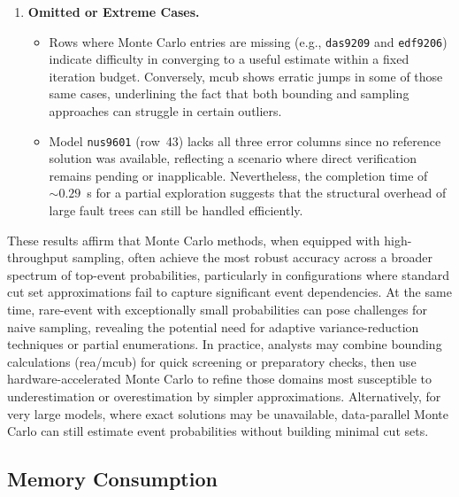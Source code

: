 \begin{enumerate}
    \item \textbf{Omitted or Extreme Cases.}
    \begin{itemize}
        \item Rows where Monte Carlo entries are missing (e.g., \texttt{das9209} and \texttt{edf9206}) indicate difficulty in converging to a useful estimate within a fixed iteration budget. Conversely, \acrshort{mcub} shows erratic jumps in some of those same cases, underlining the fact that both bounding and sampling approaches can struggle in certain outliers.
        \item Model \texttt{nus9601} (row~43) lacks all three error columns since no reference solution was available, reflecting a scenario where direct verification remains pending or inapplicable. Nevertheless, the completion time of \(\sim 0.29\)~s for a partial exploration suggests that the structural overhead of large fault trees can still be handled efficiently.
    \end{itemize}
\end{enumerate}

These results affirm that Monte Carlo methods, when equipped with high-throughput sampling, often achieve the most robust accuracy across a broader spectrum of top-event probabilities, particularly in configurations where standard cut set approximations fail to capture significant event dependencies. At the same time, rare-event with exceptionally small probabilities can pose challenges for naive sampling, revealing the potential need for adaptive variance-reduction techniques or partial enumerations. In practice, analysts may combine bounding calculations (\acrshort{rea}/\acrshort{mcub}) for quick screening or preparatory checks, then use hardware-accelerated Monte Carlo to refine those domains most susceptible to underestimation or overestimation by simpler approximations. Alternatively, for very large models, where exact solutions may be unavailable, data-parallel Monte Carlo can still estimate event probabilities without building minimal cut sets. 



\subsection{Memory Consumption}


